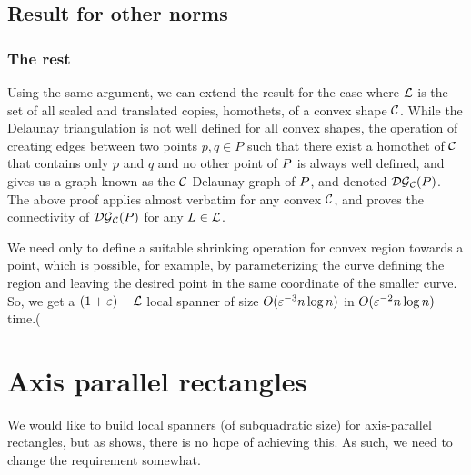 \documentclass[12pt]{article}%
\begin{document}
\subsection{Result for other norms}

\subsubsection{The rest}


Using the same argument, we can extend the result for the case where
$\mathcal{L}$ is the set of all scaled and translated copies, homothets, of a
convex shape $\mathcal{C}$. While the Delaunay triangulation is not well
defined for all convex shapes, the operation of creating edges between
two points $p,q\in P$ such that there exist a homothet of $\mathcal{C}$ that
contains only $p$ and $q$ and no other point of $P$ is always well
defined, and gives us a graph known as the $\mathcal{C}$-Delaunay graph of
$P$, and denoted $\mathcal{DG}_{\mathcal{C}}(P)$. The above proof applies almost
verbatim for any convex $\mathcal{C}$, and proves the connectivity of
$\mathcal{DG}_{\mathcal{C}}(P)$ for any $L\in \mathcal{L}$.

We need only to define a suitable shrinking operation for convex
region towards a point, which is possible, for example, by
parameterizing the curve defining the region and leaving the desired
point in the same coordinate of the smaller curve. So, we get a
$(1+\varepsilon)-\mathcal{L}$ local spanner of size $O(\varepsilon^{-3}n\log n)$ in
$O(\varepsilon^{-2}n\log n)$ time.(



\section{Axis parallel rectangles}

We would like to build local spanners (of subquadratic size) for
axis-parallel rectangles, but as  shows, there
is no hope of achieving this. As such, we need to change the
requirement somewhat.
\end{document}
